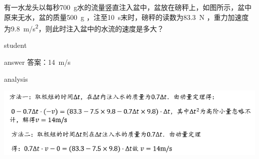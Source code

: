 \begin{example}
	有一水龙头以每秒\SI{700}{g}水的流量竖直注入盆中，盆放在磅秤上，如图所示，盆中原来无水，盆的质量\SI{500}{g} ，注至10~\si{s}末时，磅秤的读数为\SI{83.3}{N} ，重力加速度为\SI{9.8}{m/s^2}，则此时注入盆中的水流的速度是多大？
	
	\begin{taggedblock}{student}
		\vspace*{2cm}
	\end{taggedblock}
	
	
	\begin{taggedblock}{answer}
		答案：\SI{14}{m/s}
	\end{taggedblock}
	
	
	\begin{taggedblock}{analysis}
	\begin{center}
\includegraphics[width=0.8\linewidth]{image/momentum-15}
\end{center}

	\end{taggedblock}
\end{example}


